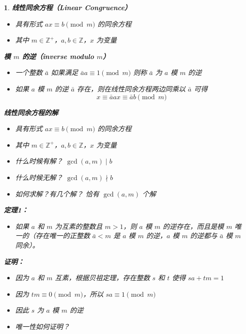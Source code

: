 \documentclass[UTF8]{report}
\theoremstyle{MyLineTheoremStyle} %
\theoremstyle{MyBlockTheoremStyle} %
\theoremstyle{MySubsubsectionStyle} %
\newtheorem{definition}{}
\begin{document}
\begin{definition}
    \textbf{线性同余方程（Linear Congruence）}
    \begin{itemize}
        \item 具有形式 $ax \equiv b \pmod{m}$ 的同余方程
        \item 其中 $m \in \mathbb{Z}^+$，$a, b \in \mathbb{Z}$，$x$ 为变量
    \end{itemize}

    \textbf{模 $m$ 的逆（inverse modulo $m$）}
    \begin{itemize}
        \item 一个整数 $\bar{a}$ 如果满足 $\bar{a}a \equiv 1 \pmod{m}$ 则称 $\bar{a}$ 为 $a$ 模 $m$ 的逆
        \item 如果 $a$ 模 $m$ 的逆 $\bar{a}$ 存在，则在线性同余方程两边同乘以 $\bar{a}$ 可得
        \[
        x \equiv \bar{a}ax \equiv \bar{a}b \pmod{m}
        \]
    \end{itemize}

    \textbf{线性同余方程的解}
    \begin{itemize}
        \item 具有形式 $ax \equiv b \pmod{m}$ 的同余方程
        \item 其中 $m \in \mathbb{Z}^+$，$a, b \in \mathbb{Z}$，$x$ 为变量
        \item 什么时候有解？ $\gcd(a, m) \mid b$
        \item 什么时候无解？ $\gcd(a, m) \nmid b$
        \item 如何求解？有几个解？ 恰有 $\gcd(a, m)$ 个解
    \end{itemize}

    \textbf{定理1：}
    \begin{itemize}
        \item 如果 $a$ 和 $m$ 为互素的整数且 $m > 1$，则 $a$ 模 $m$ 的逆存在，而且是模 $m$ 唯一的（存在唯一的正整数 $\bar{a} < m$ 是 $a$ 模 $m$ 的逆，$a$ 模 $m$ 的逆都与 $\bar{a}$ 模 $m$ 同余）。
    \end{itemize}

    \textbf{证明：}
    \begin{itemize}
        \item 因为 $a$ 和 $m$ 互素，根据贝祖定理，存在整数 $s$ 和 $t$ 使得 $sa + tm = 1$
        \item 因为 $tm \equiv 0 \pmod{m}$，所以 $sa \equiv 1 \pmod{m}$
        \item 因此 $s$ 为 $a$ 模 $m$ 的逆
        \item 唯一性如何证明？
    \end{itemize}


\end{definition}
\end{document}
